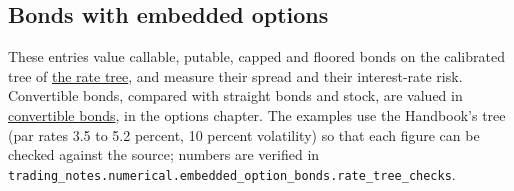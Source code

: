 \subsection{Bonds with embedded options}

These entries value callable, putable, capped and floored bonds on the calibrated tree of \hyperref[meth:binomial-rate-tree-calibration]{the rate tree}, and measure their spread and their interest-rate risk. Convertible bonds, compared with straight bonds and stock, are valued in \hyperref[meth:convertible-bond-valuation]{convertible bonds}, in the options chapter. The examples use the Handbook's tree (par rates 3.5 to 5.2 percent, 10 percent volatility) so that each figure can be checked against the source; numbers are verified in \nolinkurl{trading_notes.numerical.embedded_option_bonds.rate_tree_checks}.

